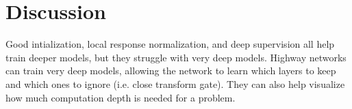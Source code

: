 \documentclass[a4paper]{article}
\begin{document}
\section{Discussion}
Good intialization, local response normalization, and deep supervision all
help train deeper models, but they struggle with very deep models. Highway
networks can train very deep models, allowing the network to learn which
layers to keep and which ones to ignore (i.e. close transform gate). They can
also help visualize how much computation depth is needed for a problem.
\end{document}

